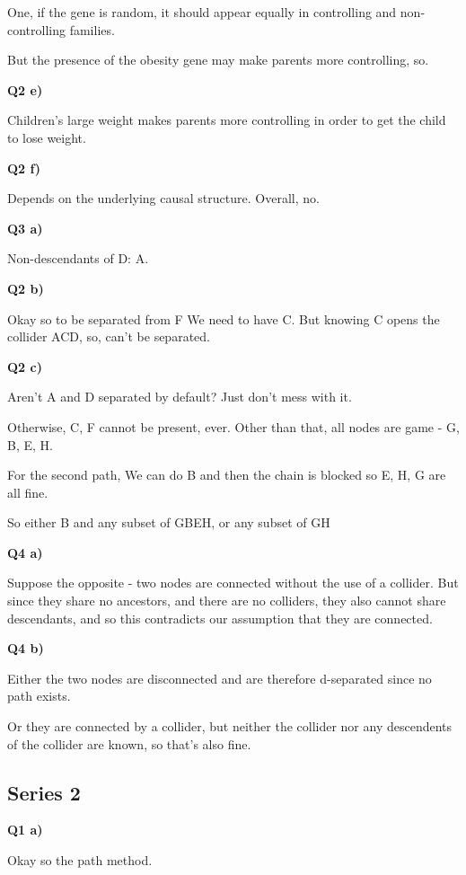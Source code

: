 \documentclass{article}
\begin{document}
			One, if the gene is random, it should appear equally in controlling and non-controlling families.
			
			But the presence of the obesity gene may make parents more controlling, so.
			
		\textbf{Q2 e)}
		
			Children's large weight makes parents more controlling in order to get the child to lose weight.
			
		\textbf{Q2 f)}
		
			Depends on the underlying causal structure. Overall, no. 
			
		\textbf{Q3 a)}
			
			Non-descendants of D: A.
			
		\textbf{Q2 b)}

			Okay so to be separated from F We need to have C.  But knowing C opens the collider ACD, so, can't be separated.
			
		\textbf{Q2 c)}
				
			Aren't A and D separated by default?  Just don't mess with it.
			
			Otherwise, C, F cannot be present, ever. Other than that, all nodes are game - G, B, E, H.
			
			For the second  path, We can do B and then the chain is blocked so E, H, G are all fine.
			
			So either B and any subset of GBEH, or any subset of GH
			
		\textbf{Q4 a)}
		
			Suppose the opposite - two nodes are connected without the use of a collider. But since they share no ancestors, and there are no colliders, they also cannot share descendants, and so this contradicts our assumption that they are connected.
			
		\textbf{Q4 b)}
		
			Either the two nodes are disconnected and are therefore d-separated since no path exists.
			
			Or they are connected by a collider, but neither the collider nor any descendents of the collider are known, so that's also fine.
			
	\subsection{Series 2}
	
		\textbf{Q1 a)}
		
			Okay so the path method.
			
\end{document}

